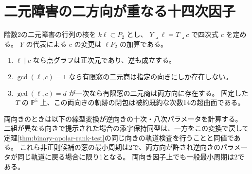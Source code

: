 \section{二元障害の二方向が重なる十四次因子}
\label{sec:binary-reverse-orientation}
\begin{theorem}\label{thm:binary-reverse-orientation}
階数2の二元障害の行列の核を $k\ell\subset P_2$ とし、
$Y\mathbin{\lrcorner}\ell=T\mathbin{\lrcorner}c$ で四次式 $c$ を定める。
$Y$ の代表による $c$ の変更は $\ell P_2$ の加算である。
\begin{enumerate}
\item $\ell\mid c$ なら点グラフは正次元であり、逆も成立する。
\item $\gcd(\ell,c)=1$ なら有限窓の二元商は指定の向きにしか存在しない。
\item $\gcd(\ell,c)=d$ が一次なら有限窓の二元商は両方向に存在する。
固定した $T$ の $\mathbb P^5$ 上、この両向きの軌跡の閉包は被約既約な次数14の超曲面である。
\end{enumerate}
両向きのときは以下の線型変換が逆向きの十次・八次パラメータを計算する。
二組が異なる向きで提示された場合の添字保持同型は、一方をこの変換で戻して
定理\ref{thm:binary-apolar-rank-test}の同じ向きの軌道検査を行うことと同値である。
これら非正則候補の窓の最小周期は2で、両方向が許され逆向きのパラメータが同じ軌道に戻る場合に限り1となる。
両向き因子上でも一般最小周期は2である。
\end{theorem}
